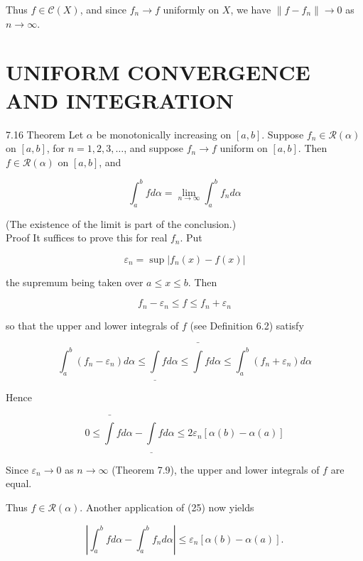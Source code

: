 \documentclass[10pt]{article}
\begin{document}
Thus $f \in \mathscr{C}(X)$, and since $f_{n} \rightarrow f$ uniformly on $X$, we have $\left\|f-f_{n}\right\| \rightarrow 0$ as $n \rightarrow \infty$.

\section*{UNIFORM CONVERGENCE AND INTEGRATION}
7.16 Theorem Let $\alpha$ be monotonically increasing on $[a, b]$. Suppose $f_{n} \in \mathscr{R}(\alpha)$ on $[a, b]$, for $n=1,2,3, \ldots$, and suppose $f_{n} \rightarrow f$ uniform on $[a, b]$. Then $f \in \mathscr{R}(\alpha)$ on $[a, b]$, and


\begin{equation*}
\int_{a}^{b} f d \alpha=\lim _{n \rightarrow \infty} \int_{a}^{b} f_{n} d \alpha \tag{23}
\end{equation*}


(The existence of the limit is part of the conclusion.)\\
Proof It suffices to prove this for real $f_{n}$. Put


\begin{equation*}
\varepsilon_{n}=\sup \left|f_{n}(x)-f(x)\right| \tag{24}
\end{equation*}


the supremum being taken over $a \leq x \leq b$. Then

$$
f_{n}-\varepsilon_{n} \leq f \leq f_{n}+\varepsilon_{n}
$$

so that the upper and lower integrals of $f$ (see Definition 6.2) satisfy


\begin{equation*}
\int_{a}^{b}\left(f_{n}-\varepsilon_{n}\right) d \alpha \leq \underline{\int} f d \alpha \leq \bar{\int} f d \alpha \leq \int_{a}^{b}\left(f_{n}+\varepsilon_{n}\right) d \alpha \tag{25}
\end{equation*}


Hence

$$
0 \leq \bar{\int} f d \alpha-\underline{\int} f d \alpha \leq 2 \varepsilon_{n}[\alpha(b)-\alpha(a)]
$$

Since $\varepsilon_{n} \rightarrow 0$ as $n \rightarrow \infty$ (Theorem 7.9), the upper and lower integrals of $f$ are equal.

Thus $f \in \mathscr{R}(\alpha)$. Another application of (25) now yields


\begin{equation*}
\left|\int_{a}^{b} f d \alpha-\int_{a}^{b} f_{n} d \alpha\right| \leq \varepsilon_{n}[\alpha(b)-\alpha(a)] . \tag{26}
\end{equation*}
\end{document}
